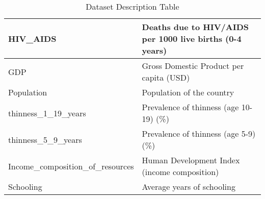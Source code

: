 \documentclass[11pt]{article}
\begin{document}
\begin{table*}[t]
\begin{tabular}{|p{}|p{}|}
HIV\_AIDS & Deaths due to HIV/AIDS per 1000 live births (0-4 years) \\ \hline
GDP & Gross Domestic Product per capita (USD) \\ \hline
Population & Population of the country \\ \hline
thinness\_1\_19\_years & Prevalence of thinness (age 10-19) (\%) \\ \hline
thinness\_5\_9\_years & Prevalence of thinness (age 5-9) (\%) \\ \hline
Income\_composition\_of\_resources & Human Development Index (income composition) \\ \hline
Schooling & Average years of schooling \\ \hline
\end{tabular}
\caption{Dataset Description Table}
\label{append:1}
\end{table*}
\end{document}

